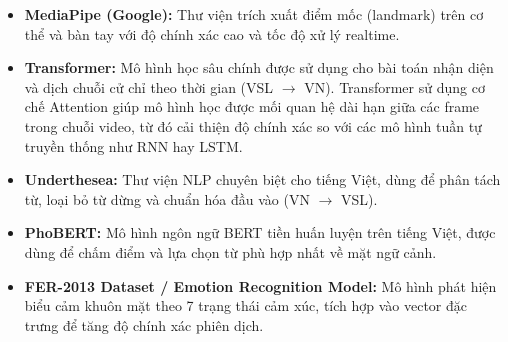 \begin{itemize}
    \item \textbf{MediaPipe (Google):} Thư viện trích xuất điểm mốc (landmark) trên cơ thể và bàn tay với độ chính xác cao và tốc độ xử lý realtime.
 
    \item \textbf{Transformer:} Mô hình học sâu chính được sử dụng cho bài toán nhận diện và dịch chuỗi cử chỉ theo thời gian (VSL $\rightarrow$ VN). Transformer sử dụng cơ chế Attention giúp mô hình học được mối quan hệ dài hạn giữa các frame trong chuỗi video, từ đó cải thiện độ chính xác so với các mô hình tuần tự truyền thống như RNN hay LSTM.

    \item \textbf{Underthesea:} Thư viện NLP chuyên biệt cho tiếng Việt, dùng để phân tách từ, loại bỏ từ dừng và chuẩn hóa đầu vào (VN $\rightarrow$ VSL).
 
    \item \textbf{PhoBERT:} Mô hình ngôn ngữ BERT tiền huấn luyện trên tiếng Việt, được dùng để chấm điểm và lựa chọn từ phù hợp nhất về mặt ngữ cảnh.
 
    \item \textbf{FER-2013 Dataset / Emotion Recognition Model:} Mô hình phát hiện biểu cảm khuôn mặt theo 7 trạng thái cảm xúc, tích hợp vào vector đặc trưng để tăng độ chính xác phiên dịch.
\end{itemize}
 